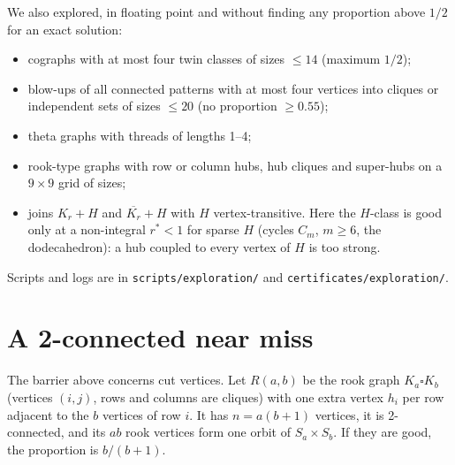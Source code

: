 \documentclass[11pt,a4paper]{report}
\begin{document}
\begin{remark}[note={other structures explored, floating point only}]
We also explored, in floating point and without finding any proportion above \(1/2\) for an exact solution:
\begin{itemize}
\item cographs with at most four twin classes of sizes \(\le14\) (maximum \(1/2\));
\item blow-ups of all connected patterns with at most four vertices into cliques or independent sets of sizes \(\le20\)
(no proportion \(\ge0.55\));
\item theta graphs with threads of lengths 1--4;
\item rook-type graphs with row or column hubs, hub cliques and super-hubs on a \(9\times9\) grid of sizes;
\item joins \(K_r+H\) and \(\overline{K_r}+H\) with \(H\) vertex-transitive. Here the \(H\)-class is good only at a
non-integral \(r^*<1\) for sparse \(H\) (cycles \(C_m\), \(m\ge6\), the dodecahedron): a hub coupled to every vertex of
\(H\) is too strong.
\end{itemize}
Scripts and logs are in \texttt{scripts/exploration/} and \texttt{certificates/exploration/}.
\end{remark}

\section{A 2-connected near miss}\label{sec:rook}

The barrier above concerns cut vertices. Let \(R(a,b)\) be the rook graph \(K_a\square K_b\) (vertices \((i,j)\), rows
and columns are cliques) with one extra vertex \(h_i\) per row adjacent to the \(b\) vertices of row \(i\). It has
\(n=a(b+1)\) vertices, it is 2-connected, and its \(ab\) rook vertices form one orbit of \(S_a\times S_b\). If they are
good, the proportion is \(b/(b+1)\).
\end{document}
